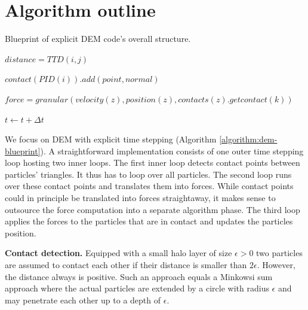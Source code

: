 \section{Algorithm outline}
\label{section:algorithm}
 
\begin{algorithm}
 
   Blueprint of explicit DEM code's overall structure.
 
 \label{algorithm:dem-blueprint}
 \begin{algorithmic}[1]
   

				
			\State $distance = TTD(i,j)$
				

				\State $contact(PID(i)).add(point, normal)$

			\EndIf
			
		\EndFor
			
	\EndFor




			\State $force = granular(velocity(z), position(z), contacts(z).getcontact(k))$

		\EndFor
	
	\EndFor    
    
     \State $t \gets t + \Delta t$
   \EndFor   

 \end{algorithmic}
\end{algorithm} 


We focus on DEM with explicit time stepping (Algorithm \ref{algorithm:dem-blueprint}). 
A straightforward implementation consists of one outer time stepping loop
hosting two inner loops. 
The first inner loop detects contact points between particles' triangles.
It thus has to loop over all particles.
The second loop runs over these contact points and translates them into forces.
While contact points could in principle be translated into forces straightaway,
it makes sense to outsource the force computation into a separate algorithm
phase.
The third loop applies the forces to the particles that are in contact and updates the particles
position.

{\bf Contact detection.}
Equipped with a small halo layer of size $\epsilon >0$ two particles are assumed to contact each other if their distance is smaller than $2\epsilon$. 
However, the distance always is positive.
Such an approach equals a Minkowsi sum approach \cite{Ericson2005} where the actual particles are extended by a circle with radius $\epsilon$ and may penetrate each other up to a depth of $\epsilon $.


